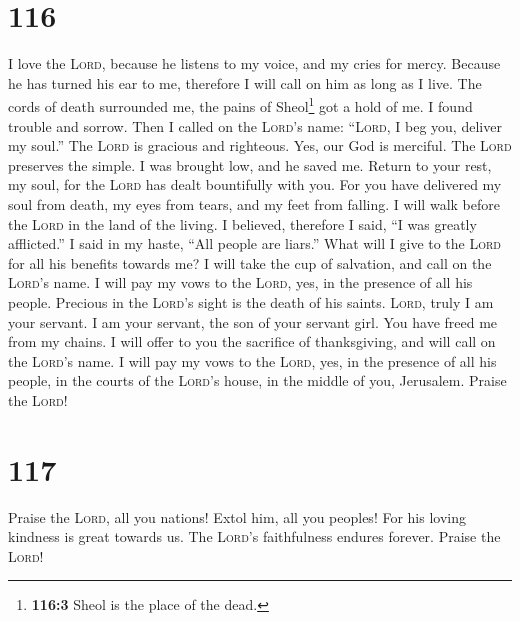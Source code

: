 \hypertarget{section-115}{%
\section{116}\label{section-115}}

 I love the \textsc{Lord}, because he listens to my voice,
and my cries for mercy.  Because he has turned his ear to
me, therefore I will call on him as long as I live.  The
cords of death surrounded me, the pains of Sheol\footnote{\textbf{116:3}
  Sheol is the place of the dead.} got a hold of me. I found trouble and
sorrow.  Then I called on the \textsc{Lord}'s name:
``\textsc{Lord}, I beg you, deliver my soul.''  The
\textsc{Lord} is gracious and righteous. Yes, our God is merciful.
 The \textsc{Lord} preserves the simple. I was brought
low, and he saved me.  Return to your rest, my soul, for
the \textsc{Lord} has dealt bountifully with you.  For you
have delivered my soul from death, my eyes from tears, and my feet from
falling.  I will walk before the \textsc{Lord} in the land
of the living.  I believed, therefore I said, ``I was
greatly afflicted.''  I said in my haste, ``All people
are liars.''  What will I give to the \textsc{Lord} for
all his benefits towards me?  I will take the cup of
salvation, and call on the \textsc{Lord}'s name.  I will
pay my vows to the \textsc{Lord}, yes, in the presence of all his
people.  Precious in the \textsc{Lord}'s sight is the
death of his saints.  \textsc{Lord}, truly I am your
servant. I am your servant, the son of your servant girl. You have freed
me from my chains.  I will offer to you the sacrifice of
thanksgiving, and will call on the \textsc{Lord}'s name. 
I will pay my vows to the \textsc{Lord}, yes, in the presence of all his
people,  in the courts of the \textsc{Lord}'s house, in
the middle of you, Jerusalem. Praise the \textsc{Lord}!

\hypertarget{section-116}{%
\section{117}\label{section-116}}

 Praise the \textsc{Lord}, all you nations! Extol him, all
you peoples!  For his loving kindness is great towards us.
The \textsc{Lord}'s faithfulness endures forever. Praise the
\textsc{Lord}!

